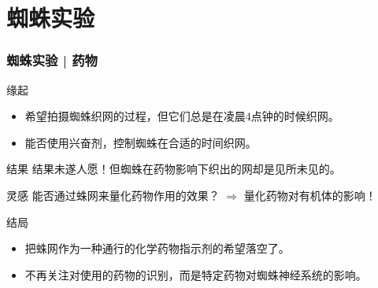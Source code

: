 \section{蜘蛛实验}
\begin{frame}
  \frametitle{蜘蛛实验 | 药物}
  \begin{block}{缘起}
    \begin{itemize}
      \item 希望拍摄蜘蛛织网的过程，但它们总是在凌晨4点钟的时候织网。
      \item 能否使用兴奋剂，控制蜘蛛在合适的时间织网。
    \end{itemize}
  \end{block}
  \pause
  \begin{block}{结果}
    结果未遂人愿！但蜘蛛在药物影响下织出的网却是见所未见的。
  \end{block}
  \pause
  \begin{block}{灵感}
    能否通过蛛网来量化药物作用的效果？ $\Longrightarrow$ 量化药物对有机体的影响！
  \end{block}
  \pause
  \begin{block}{结局}
    \begin{itemize}
      \item 把蛛网作为一种通行的化学药物指示剂的希望落空了。
      \item 不再关注对使用的药物的识别，而是特定药物对蜘蛛神经系统的影响。
    \end{itemize}
  \end{block}
\end{frame}

